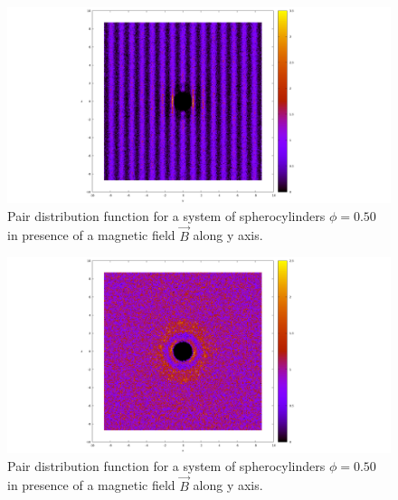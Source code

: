 \documentclass{article}
\begin{document}
\begin{figure}
    \begin{center}
    \includegraphics[width=1.0\columnwidth]{gyz_B.png}
    \caption{Pair distribution function for a system of spherocylinders $\phi = 0.50$ in presence of a magnetic field $\vec{B}$ along y axis.}
    \label{fig:gyz_B}
    \end{center}
\end{figure}


\begin{figure}
    \centering
    \includegraphics[width=1.0\columnwidth]{gxz_B.png}
    \caption{Pair distribution function for a system of spherocylinders $\phi = 0.50$ in presence of a magnetic field $\vec{B}$ along y axis.}
    \label{fig:gxz_B}
\end{figure}
\end{document}
